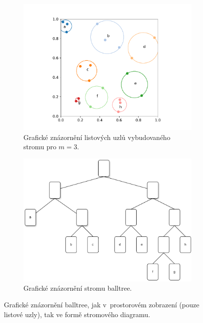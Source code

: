 \begin{figure}[!t]
\begin{subfigure}[t]{0.45\columnwidth}
    \includegraphics[width=0.4\textheight]{obrazky-figures/balltree/full_balltree.pdf}
    \caption{Grafické znázornění listových uzlů vybudovaného stromu pro $m = 3$.}
\end{subfigure}
\hfill
\begin{subfigure}[t]{0.45\columnwidth}
    \includegraphics[width=0.3\textheight]{obrazky-figures/balltree/diagram_balltree.drawio.pdf}
    \caption{Grafické znázornění stromu balltree.}
\end{subfigure}
\caption{Grafické znázornění balltree, jak v~prostorovém zobrazení (pouze listové uzly), tak ve formě stromového diagramu.}
\label{fig:balltree_done}
\end{figure}

